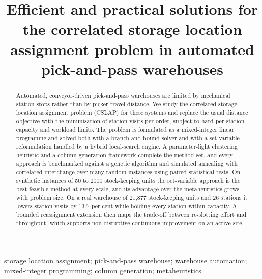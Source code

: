 \documentclass[]{interact}
\begin{document}

\title{Efficient and practical solutions for the correlated storage location assignment problem in automated pick-and-pass warehouses}

\author{
}

\maketitle

\begin{abstract}
Automated, conveyor-driven pick-and-pass warehouses are limited by mechanical station stops rather than by picker travel distance. We study the correlated storage location assignment problem (CSLAP) for these systems and replace the usual distance objective with the minimisation of station visits per order, subject to hard per-station capacity and workload limits. The problem is formulated as a mixed-integer linear programme and solved both with a branch-and-bound solver and with a set-variable reformulation handled by a hybrid local-search engine. A parameter-light clustering heuristic and a column-generation framework complete the method set, and every approach is benchmarked against a genetic algorithm and simulated annealing with correlated interchange over many random instances using paired statistical tests. On synthetic instances of 50 to 2000 stock-keeping units the set-variable approach is the best feasible method at every scale, and its advantage over the metaheuristics grows with problem size. On a real warehouse of 21,877 stock-keeping units and 26 stations it lowers station visits by 13.7 per cent while holding every station within capacity. A bounded reassignment extension then maps the trade-off between re-slotting effort and throughput, which supports non-disruptive continuous improvement on an active site.
\end{abstract}

\begin{keywords}
storage location assignment; pick-and-pass warehouse; warehouse automation; mixed-integer programming; column generation; metaheuristics
\end{keywords}
\end{document}
